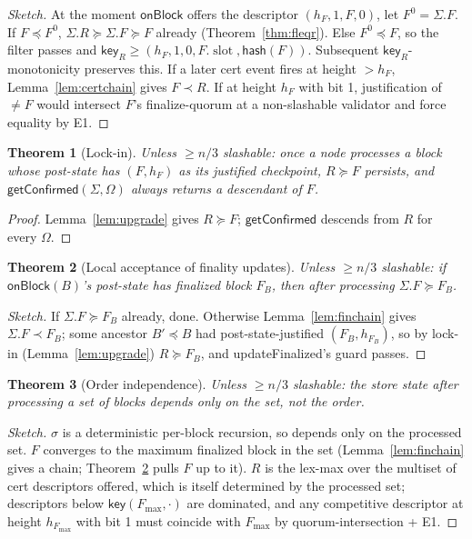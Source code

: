 \documentclass{article}
\newcommand{\slot}{\operatorname{\mathrm{slot}}}
\newcommand{\hash}{\mathsf{hash}}
\newcommand{\key}{\mathsf{key}}
\newcommand{\onBlock}{\textsf{onBlock}\xspace}
\newcommand{\updateFinalized}{\textsf{updateFinalized}\xspace}
\newcommand{\getConfirmed}{\textsf{getConfirmed}\xspace}
\theoremstyle{plain}
\newtheorem{theorem}{Theorem}
\theoremstyle{definition}
\theoremstyle{remark}
\begin{document}
\begin{proof}[Sketch]
At the moment $\onBlock$ offers the descriptor $(h_F, 1, F, 0)$, let $F^0 = \Sigma.F$. If $F \preceq F^0$, $\Sigma.R \succeq \Sigma.F \succeq F$ already (Theorem~\ref{thm:fleqr}). Else $F^0 \preceq F$, so the filter passes and $\key_R \geq (h_F, 1, 0, F.\slot, \hash(F))$. Subsequent $\key_R$-monotonicity preserves this. If a later cert event fires at height $> h_F$, Lemma~\ref{lem:certchain} gives $F \prec R$. If at height $h_F$ with bit 1, justification of $\neq F$ would intersect $F$'s finalize-quorum at a non-slashable validator and force equality by E1.
\end{proof}

\begin{theorem}[Lock-in]\label{thm:lockin}
Unless $\geq n/3$ slashable: once a node processes a block whose post-state has $(F, h_F)$ as its justified checkpoint, $R \succeq F$ persists, and $\getConfirmed(\Sigma, \Omega)$ always returns a descendant of $F$.
\end{theorem}

\begin{proof}[Proof]
Lemma~\ref{lem:upgrade} gives $R \succeq F$; $\getConfirmed$ descends from $R$ for every $\Omega$.
\end{proof}

\begin{theorem}[Local acceptance of finality updates]\label{thm:finlive}
Unless $\geq n/3$ slashable: if $\onBlock(B)$'s post-state has finalized block $F_B$, then after processing $\Sigma.F \succeq F_B$.
\end{theorem}

\begin{proof}[Sketch]
If $\Sigma.F \succeq F_B$ already, done. Otherwise Lemma~\ref{lem:finchain} gives $\Sigma.F \prec F_B$; some ancestor $B' \preceq B$ had post-state-justified $(F_B, h_{F_B})$, so by lock-in (Lemma~\ref{lem:upgrade}) $R \succeq F_B$, and \updateFinalized's guard passes.
\end{proof}

\begin{theorem}[Order independence]\label{thm:orderindep}
Unless $\geq n/3$ slashable: the store state after processing a set of blocks depends only on the set, not the order.
\end{theorem}

\begin{proof}[Sketch]
$\sigma$ is a deterministic per-block recursion, so depends only on the processed set. $F$ converges to the maximum finalized block in the set (Lemma~\ref{lem:finchain} gives a chain; Theorem~\ref{thm:finlive} pulls $F$ up to it). $R$ is the lex-max over the multiset of cert descriptors offered, which is itself determined by the processed set; descriptors below $\key(F_{\max}, \cdot)$ are dominated, and any competitive descriptor at height $h_{F_{\max}}$ with bit 1 must coincide with $F_{\max}$ by quorum-intersection + E1.
\end{proof}
\end{document}
